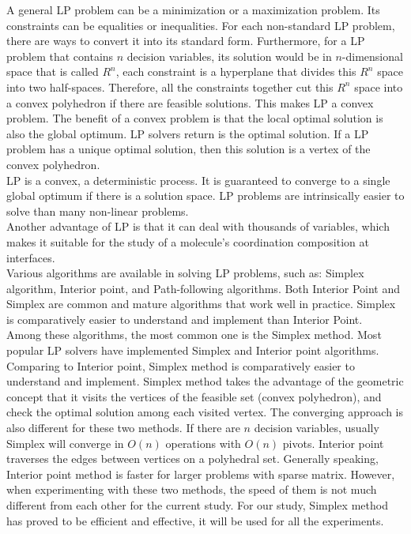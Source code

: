 A general LP problem can be a minimization or a maximization problem. Its constraints can be equalities or inequalities. For each non-standard LP problem, there are ways to convert it into its standard form. Furthermore, for a LP problem that contains $n$ decision variables, its solution would be in $n$-dimensional space that is called $R^{n}$, each constraint is a hyperplane that divides this $R^{n}$ space into two half-spaces. Therefore, all the constraints together cut this $R^{n}$ space into a convex polyhedron if there are feasible solutions. This makes LP a convex problem. The benefit of a convex problem is that the local optimal solution is also the global optimum. LP solvers return is the optimal solution. If a LP problem has a unique optimal solution, then this solution is a vertex of the convex polyhedron.\\

LP is a convex, a deterministic process. It is guaranteed to converge to a single global optimum if there is a solution space. LP problems are intrinsically easier to solve than many non-linear problems. \\

Another advantage of LP is that it can deal with thousands of variables, which makes it suitable for the study of a molecule's coordination composition at interfaces. \\

Various algorithms are available in solving LP problems, such as: Simplex algorithm, Interior point, and Path-following algorithms. Both Interior Point and Simplex are common and mature algorithms that work well in practice. Simplex is comparatively easier to understand and implement than Interior Point.\\

Among these algorithms, the most common one is the Simplex method. Most popular LP solvers have implemented Simplex and Interior point algorithms.  Comparing to Interior point, Simplex method is comparatively easier to understand and implement. Simplex method takes the advantage of the geometric concept that it visits the vertices of the feasible set (convex polyhedron), and check the optimal solution among each visited vertex. The converging approach is also different for these two methods. If there are $n$ decision variables, usually Simplex will converge in $O(n)$ operations with $O(n)$ pivots. Interior point traverses the edges between vertices on a polyhedral set. Generally speaking, Interior point method is faster for larger problems with sparse matrix. However, when experimenting with these two methods, the speed of them is not much different from each other for the current study. For our study, Simplex method has proved to be efficient and effective, it will be used for all the experiments. \\


